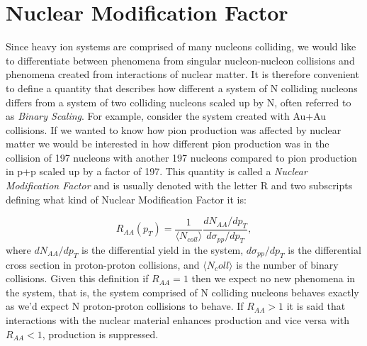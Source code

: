 \chapter{Nuclear Modification Factor} %
\label{nuclmodfactapp}

Since heavy ion systems are comprised of many nucleons colliding, we would like to differentiate between phenomena from singular nucleon-nucleon collisions and phenomena created from interactions of nuclear matter. It is therefore convenient to define a quantity that describes how different a system of N colliding nucleons differs from a system of two colliding nucleons scaled up by N, often referred to as \textit{Binary Scaling}. For example, consider the system created with Au+Au collisions. If we wanted to know how pion production was affected by nuclear matter we would be interested in how different pion production was in the collision of 197 nucleons with another 197 nucleons compared to pion production in p+p scaled up by a factor of 197. This quantity is called a \textit{Nuclear Modification Factor} and is usually denoted with the letter R and two subscripts defining what kind of Nuclear Modification Factor it is:

\begin{equation}
R_{AA}(p_{T}) = \frac{1}{\langle N_{coll} \rangle} \frac{dN_{AA}/dp_{T}}{d\sigma_{pp}/dp_{T}},
\end{equation}
where $dN_{AA}/dp_{T}$ is the differential yield in the system, $d\sigma_{pp}/dp_{T}$ is the differential cross section in proton-proton collisions, and $\langle N_coll \rangle$ is the number of binary collisions. Given this definition if $R_{AA}=1$ then we expect no new phenomena in the system, that is, the system comprised of N colliding nucleons behaves exactly as we'd expect N proton-proton collisions to behave. If $R_{AA}>1$ it is said that interactions with the nuclear material enhances production and vice versa with $R_{AA}<1$, production is suppressed.